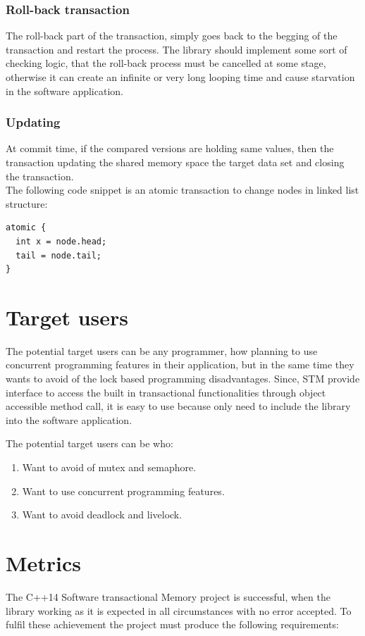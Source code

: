 \documentclass[12pt]{article}
\begin{document}
\subsubsection{Roll-back transaction}
The roll-back part of the transaction, simply goes back to the begging of the transaction and restart the process. The library should implement some sort of checking logic, that the roll-back process must be cancelled at some stage, otherwise it can create an infinite or very long looping time and cause starvation in the software application.

\subsubsection{Updating}
At commit time, if the compared versions are holding same values, then the transaction updating the shared memory space the target data set and closing the transaction. \\

The following code snippet is an atomic transaction to change nodes in linked list structure:
\begin{lstlisting}
atomic {
  int x = node.head;
  tail = node.tail;
}
\end{lstlisting}
\clearpage
\section{Target users}
The potential target users can be any programmer, how planning to use concurrent programming features in their application, but in the same time they wants to avoid of the lock based programming disadvantages. Since, STM provide interface to access the built in transactional functionalities through object accessible method call, it is easy to use because only need to include the library into the software application.\\

{\setlength{\parindent}{0cm}
The potential target users can be who:
\begin{enumerate}
\item Want to avoid of mutex and semaphore.
\item Want to use concurrent programming features.
\item Want to avoid deadlock and livelock.
\end{enumerate}
}


\section{Metrics}
The C++14 Software transactional Memory project is successful, when the library working as it is expected in all circumstances with no error accepted. To fulfil these achievement the project must produce the following requirements:
\end{document}
